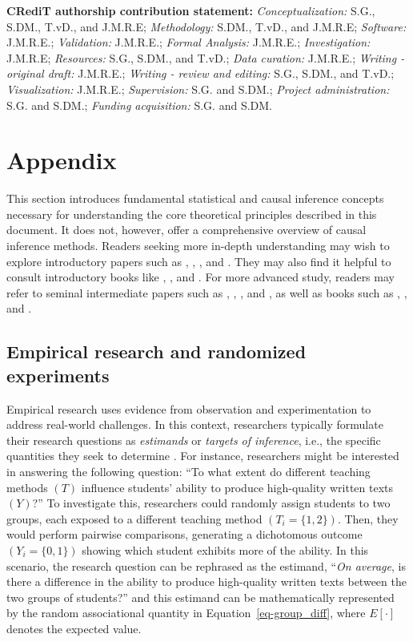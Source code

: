 \documentclass[
  authoryear,
  review,
  1p]{elsarticle}
\begin{document}
\textbf{CRediT authorship contribution statement:}
\emph{Conceptualization:} S.G., S.DM., T.vD., and J.M.R.E;
\emph{Methodology:} S.DM., T.vD., and J.M.R.E; \emph{Software:}
J.M.R.E.; \emph{Validation:} J.M.R.E.; \emph{Formal Analysis:} J.M.R.E.;
\emph{Investigation:} J.M.R.E; \emph{Resources:} S.G., S.DM., and T.vD.;
\emph{Data curation:} J.M.R.E.; \emph{Writing - original draft:}
J.M.R.E.; \emph{Writing - review and editing:} S.G., S.DM., and T.vD.;
\emph{Visualization:} J.M.R.E.; \emph{Supervision:} S.G. and S.DM.;
\emph{Project administration:} S.G. and S.DM.; \emph{Funding
acquisition:} S.G. and S.DM.

\newpage{}

\section{Appendix}\label{sec-appendix}

This section introduces fundamental statistical and causal inference
concepts necessary for understanding the core theoretical principles
described in this document. It does not, however, offer a comprehensive
overview of causal inference methods. Readers seeking more in-depth
understanding may wish to explore introductory papers such as
\citet{Pearl_2010}, \citet{Rohrer_2018}, \citet{Pearl_2019}, and
\citet{Cinelli_et_al_2020}. They may also find it helpful to consult
introductory books like \citet{Pearl_et_al_2018}, \citet{Neal_2020}, and
\citet{McElreath_2020}. For more advanced study, readers may refer to
seminal intermediate papers such as \citet{Neyman_et_al_1923},
\citet{Rubin_1974}, \citet{Spirtes_et_al_1991}, and \citet{Sekhon_2009},
as well as books such as \citet{Pearl_2009}, \citet{Morgan_et_al_2014},
and \citet{Hernan_et_al_2020}.

\subsection{Empirical research and randomized
experiments}\label{sec-appendix-A}

Empirical research uses evidence from observation and experimentation to
address real-world challenges. In this context, researchers typically
formulate their research questions as \emph{estimands} or \emph{targets
of inference}, i.e., the specific quantities they seek to determine
\citep{Everitt_et_al_2010}. For instance, researchers might be
interested in answering the following question: ``To what extent do
different teaching methods \((T)\) influence students' ability to
produce high-quality written texts \((Y)\)?'' To investigate this,
researchers could randomly assign students to two groups, each exposed
to a different teaching method \((T_{i} = \{1,2\})\). Then, they would
perform pairwise comparisons, generating a dichotomous outcome
\((Y_{i} = \{0,1\})\) showing which student exhibits more of the
ability. In this scenario, the research question can be rephrased as the
estimand, ``\emph{On average}, is there a difference in the ability to
produce high-quality written texts between the two groups of students?''
and this estimand can be mathematically represented by the random
associational quantity in Equation~\ref{eq-group_diff}, where
\(E[\cdot]\) denotes the expected value.
\end{document}
